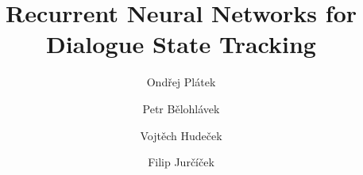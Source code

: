 \documentclass{itatnew}
\def\OP#1{\textcolor{purple}{OP: \textit{#1}}}
\def\OP#1{\relax}  %
\def\PB#1{\textcolor{red}{PB: \textit{#1}}}
\begin{document}
\title{Recurrent Neural Networks for Dialogue State Tracking}

\author{Ondřej Plátek \and Petr Bělohlávek \and Vojtěch Hudeček  \and Filip Jurčíček}


\maketitle              %

\OP{not standard metric and comparison to other systems \\}
\OP{reference na dstc2 - todo provide link to footnote \\}

\OP{jak dlouho trvala epocha - proc je tak pomala? \\}
\OP{accuracies on train set \\}
\OP{myslim, ze to mam dobre, ale v camera ready to zkontrolujem - nestiham. \PB{nemusi byt podekovani metacentru v nejake jejich oficialni podobe - link v komentari?} \url{https://wiki.metacentrum.cz/wiki/Pravidla-BLABLA}}
\end{document}
